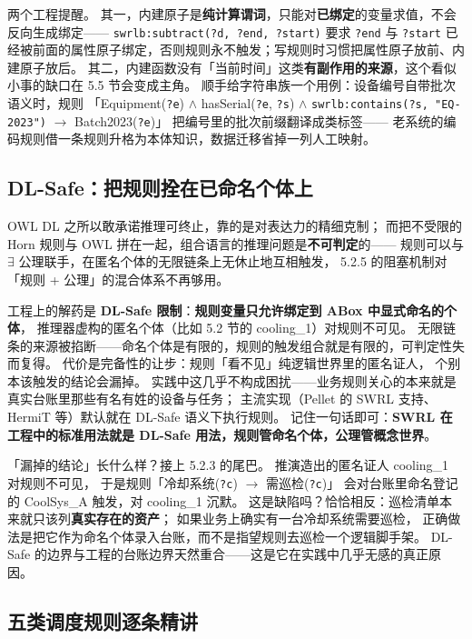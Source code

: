 两个工程提醒。
其一，内建原子是\textbf{纯计算谓词}，只能对\textbf{已绑定}的变量求值，不会反向生成绑定——
\texttt{swrlb:subtract(?d, ?end, ?start)} 要求 \texttt{?end} 与 \texttt{?start}
已经被前面的属性原子绑定，否则规则永不触发；写规则时习惯把属性原子放前、内建原子放后。
其二，内建函数没有「当前时间」这类\textbf{有副作用的来源}，这个看似小事的缺口在 5.5 节会变成主角。
顺手给字符串族一个用例：设备编号自带批次语义时，规则
「Equipment(\texttt{?e}) \(\land\) hasSerial(\texttt{?e}, \texttt{?s}) \(\land\)
\texttt{swrlb:contains(?s, "EQ-2023")} \(\rightarrow\) Batch2023(\texttt{?e})」
把编号里的批次前缀翻译成类标签——
老系统的编码规则借一条规则升格为本体知识，数据迁移省掉一列人工映射。

\subsection{DL-Safe：把规则拴在已命名个体上}

OWL DL 之所以敢承诺推理可终止，靠的是对表达力的精细克制；
而把不受限的 Horn 规则与 OWL 拼在一起，组合语言的推理问题是\textbf{不可判定}的——
规则可以与 \(\exists\) 公理联手，在匿名个体的无限链条上无休止地互相触发，
5.2.5 的阻塞机制对「规则 + 公理」的混合体系不再够用。

工程上的解药是 \textbf{DL-Safe 限制}：\textbf{规则变量只允许绑定到 ABox 中显式命名的个体}，
推理器虚构的匿名个体（比如 5.2 节的 cooling\_1）对规则不可见。
无限链条的来源被掐断——命名个体是有限的，规则的触发组合就是有限的，可判定性失而复得。
代价是完备性的让步：规则「看不见」纯逻辑世界里的匿名证人，
个别本该触发的结论会漏掉。
实践中这几乎不构成困扰——业务规则关心的本来就是真实台账里那些有名有姓的设备与任务；
主流实现（Pellet 的 SWRL 支持、HermiT 等）默认就在 DL-Safe 语义下执行规则。
记住一句话即可：\textbf{SWRL 在工程中的标准用法就是 DL-Safe 用法，规则管命名个体，公理管概念世界}。

「漏掉的结论」长什么样？接上 5.2.3 的尾巴。
推演造出的匿名证人 cooling\_1 对规则不可见，
于是规则「冷却系统(\texttt{?c}) \(\rightarrow\) 需巡检(\texttt{?c})」
会对台账里命名登记的 CoolSys\_A 触发，对 cooling\_1 沉默。
这是缺陷吗？恰恰相反：巡检清单本来就只该列\textbf{真实存在的资产}；
如果业务上确实有一台冷却系统需要巡检，
正确做法是把它作为命名个体录入台账，而不是指望规则去巡检一个逻辑脚手架。
DL-Safe 的边界与工程的台账边界天然重合——这是它在实践中几乎无感的真正原因。

\subsection{五类调度规则逐条精讲}

